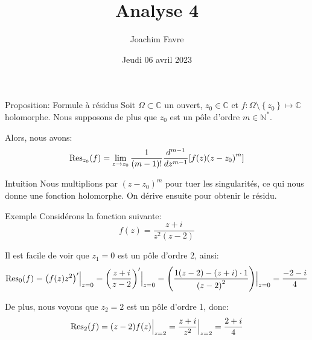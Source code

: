 \documentclass[a4paper]{article}
\title{Analyse 4}
\author{Joachim Favre}
\date{Jeudi 06 avril 2023}
\begin{document}
\maketitle


\begin{parag}{Proposition: Formule à résidus}
    Soit $\Omega \subset \mathbb{C}$ un ouvert, $z_0 \in \mathbb{C}$ et $f: \Omega \setminus \left\{z_0\right\} \mapsto \mathbb{C}$ holomorphe. Nous supposons de plus que $z_0$ est un pôle d'ordre $m \in \mathbb{N}^*$.

    Alors, nous avons: 
    \[\Res_{z_0}\left(f\right) =  \lim_{z \to z_0} \frac{1}{\left(m-1\right)!} \frac{d^{m-1}}{dz^{m-1}} \left[f\left(z\right)\left(z-z_0\right)^m\right]\]
    
    \begin{subparag}{Intuition}
        Nous multiplions par $\left(z-z_0\right)^m$ pour tuer les singularités, ce qui nous donne une fonction holomorphe. On dérive ensuite pour obtenir le résidu.
    \end{subparag}
\end{parag}

\begin{parag}{Exemple}
    Considérons la fonction suivante: 
    \[f\left(z\right)= \frac{z+i}{z^2 \left(z-2\right)}\]
    
    Il est facile de voir que $z_1 = 0$ est un pôle d'ordre 2, ainsi: 
    \[\Res_{0}\left(f\right) = \left(f\left(z\right)z^2\right)' \eval_{z=0}^{} = \left(\frac{z+i}{z-2}\right)' \eval_{z=0}^{} = \left(\frac{1\left(z-2\right) - \left(z+i\right)\cdot 1}{\left(z-2\right)^2}\right) \eval_{z=0}^{} = \frac{-2 - i}{4}\]

    De plus, nous voyons que $z_2 = 2$ est un pôle d'ordre 1, donc: 
    \[\Res_2\left(f\right) = \left(z-2\right)f\left(z\right) \eval_{z=2}^{} = \frac{z+i}{z^2} \eval_{z=2}^{} = \frac{2+i}{4}\]
\end{parag}
\end{document}
